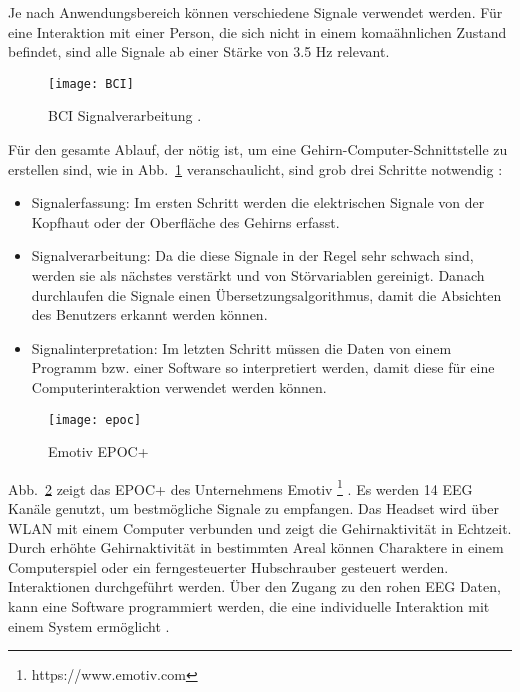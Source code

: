\vspace{\baselineskip}
Je nach Anwendungsbereich können verschiedene Signale verwendet werden. Für eine Interaktion mit einer Person, die sich nicht in einem komaähnlichen Zustand befindet, sind alle Signale ab einer Stärke von 3.5 Hz relevant.
\newline \newline
%
%
\begin{figure}
\centering
\texttt{[image: BCI]}
\caption{BCI Signalverarbeitung \cite{BRAIN}.}
\label{fig:BCI}
\end{figure}
%
%
Für den gesamte Ablauf, der nötig ist, um eine Gehirn-Computer-Schnittstelle zu erstellen sind, wie in Abb.~\ref{fig:BCI} veranschaulicht, sind grob drei Schritte notwendig \cite{BRAIN}:
\begin{itemize}
      \item Signalerfassung: Im ersten Schritt werden die elektrischen Signale von der Kopfhaut oder der Oberfläche des Gehirns erfasst.
      \item Signalverarbeitung: Da die diese Signale in der Regel sehr schwach sind, werden sie als nächstes verstärkt und von Störvariablen gereinigt. Danach durchlaufen die Signale einen Übersetzungsalgorithmus, damit die Absichten des Benutzers erkannt werden können.
			\item Signalinterpretation: Im letzten Schritt müssen die Daten von einem Programm bzw. einer Software so interpretiert werden, damit diese für eine Computerinteraktion verwendet werden können.
\end{itemize}
%
%
\vspace{\baselineskip}
\vspace{\baselineskip}
\vspace{\baselineskip}
\begin{figure}
\centering
\texttt{[image: epoc]}
\caption{Emotiv EPOC+ \cite{epoc}}
\label{fig:epoc}
\end{figure}
\vspace{\baselineskip}
Abb.~\ref{fig:epoc} zeigt das EPOC+ des Unternehmens Emotiv%
\footnote{https://www.emotiv.com}
%
. Es werden 14 EEG Kanäle genutzt, um bestmögliche Signale zu empfangen. Das Headset wird über WLAN mit einem Computer verbunden und zeigt die Gehirnaktivität in Echtzeit. Durch erhöhte Gehirnaktivität in bestimmten Areal können Charaktere in einem Computerspiel oder ein ferngesteuerter Hubschrauber gesteuert werden. Interaktionen durchgeführt werden. Über den Zugang zu den rohen EEG Daten, kann eine  Software programmiert werden, die eine individuelle Interaktion mit einem System ermöglicht \cite{epoc}. 
